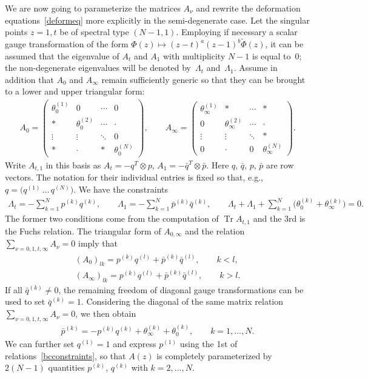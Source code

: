\documentclass[pdftex]{sigma}
\numberwithin{equation}{section}
\begin{document}
We are now going to parameterize the matrices $A_{\nu}$ and rewrite the deformation equations~\eqref{deformeq} more explicitly in the semi-degenerate case. Let the singular points $z=1,t$ be of spectral type $(N-1,1)$. Employing if necessary a scalar gauge transformation of the form $\Phi(z) \mapsto (z-t)^a(z-1)^b \tilde{\Phi}(z)$, it can be assumed that the eigenvalue of $A_t$ and $A_1$ with multiplicity $N-1$ is equal to~$0$; the non-degenerate eigenvalues will be denoted by~$\Lambda_t$ and~$\Lambda_1$. Assume in addition that $A_0$ and $A_{\infty}$ remain sufficiently generic so that they can be brought to a lower and upper triangular form:
\begin{gather*}%
A_0=\left(\begin{matrix}
\theta_0^{(1)} & 0 & \cdots & 0 \\
* & \theta_0^{(2)} & \cdots & \cdot \\
\vdots & \vdots & \ddots & 0 \\
* & \cdot & * & \theta_0^{(N)}
\end{matrix}\right),\qquad
A_{\infty}=\left(\begin{matrix}
\theta_{\infty}^{(1)} & * & \cdots & * \\
0 & \theta_{\infty}^{(2)} & \cdots & \cdot \\
\vdots & \vdots & \ddots & * \\
0 & \cdot & 0 & \theta_{\infty}^{(N)}
\end{matrix}\right).
\end{gather*}
Write $A_{t,1}$ in this basis as $A_t=-q^T\otimes p$, $A_1=-\bar q^T\otimes\bar p$. Here $q$, $\bar q$, $p$, $\bar p$ are row vectors. The notation for their individual entries is fixed so that, e.g., $q=\big(
q^{(1)} \,\ldots \, q^{(N)}\big)$. We have the constraints
\begin{gather}\label{bcconstraints}
\Lambda_t=-\sum_{k=1}^N p^{(k)}q^{(k)},\qquad \Lambda_1=-\sum_{k=1}^N \bar p^{(k)}\bar q^{(k)},\qquad
\Lambda_t+\Lambda_1+\sum_{k=1}^N\big(\theta_0^{(k)}+ \theta_{\infty}^{(k)}\big)=0.
\end{gather}
The former two conditions come from the computation of $\operatorname{Tr}A_{t,1}$ and the 3rd is the Fuchs relation. The triangular form of $A_{0,\infty}$ and the relation $\sum\limits_{\nu=0,1,t,\infty}A_{\nu}=0$ imply that
\begin{gather*}
(A_0)_{lk} = p^{(k)}q^{(l)}+\bar p^{(k)} \bar q^{(l)},\qquad k<l,\\
(A_{\infty})_{lk}= p^{(k)}q^{(l)}+\bar p^{(k)} \bar q^{(l)},\qquad k>l.
\end{gather*}
If all $\bar q^{(k)}\ne0$, the remaining freedom of diagonal gauge transformations can be used to set $\bar q^{(k)}=1$. Considering the diagonal of the same matrix relation $\sum\limits_{\nu=0,1,t,\infty}A_{\nu}=0$, we then obtain
\begin{gather*}
\bar p^{(k)}=-p^{(k)}q^{(k)}+\theta_{\infty}^{(k)}+\theta_0^{(k)},\qquad k=1,\ldots, N.
\end{gather*}
We can further set $q^{(1)}=1$ and express $p^{(1)}$ using the 1st of relations~\eqref{bcconstraints}, so that $A(z)$ is completely parameterized by $2(N-1)$ quantities $p^{(k)}$, $q^{(k)}$ with $k=2,\ldots,N$.
\end{document}
